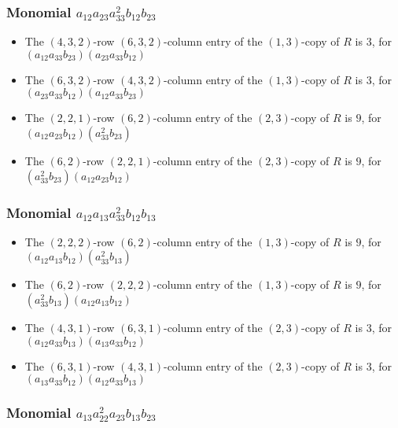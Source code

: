 \documentclass{article}
\begin{document}
\subsubsection{Monomial $ a_{12} a_{23} a_{33}^{2} b_{12} b_{23} $}

\begin{itemize}
\item The $(4, 3, 2)$-row $(6, 3, 2)$-column entry of the $ \left(1, 3\right) $-copy of $R$ is $ 3 $, for $( a_{12} a_{33} b_{23} )( a_{23} a_{33} b_{12} )$ 
\item The $(6, 3, 2)$-row $(4, 3, 2)$-column entry of the $ \left(1, 3\right) $-copy of $R$ is $ 3 $, for $( a_{23} a_{33} b_{12} )( a_{12} a_{33} b_{23} )$ 
\item The $(2, 2, 1)$-row $(6, 2)$-column entry of the $ \left(2, 3\right) $-copy of $R$ is $ 9 $, for $( a_{12} a_{23} b_{12} )( a_{33}^{2} b_{23} )$ 
\item The $(6, 2)$-row $(2, 2, 1)$-column entry of the $ \left(2, 3\right) $-copy of $R$ is $ 9 $, for $( a_{33}^{2} b_{23} )( a_{12} a_{23} b_{12} )$ 
\end{itemize}
\subsubsection{Monomial $ a_{12} a_{13} a_{33}^{2} b_{12} b_{13} $}

\begin{itemize}
\item The $(2, 2, 2)$-row $(6, 2)$-column entry of the $ \left(1, 3\right) $-copy of $R$ is $ 9 $, for $( a_{12} a_{13} b_{12} )( a_{33}^{2} b_{13} )$ 
\item The $(6, 2)$-row $(2, 2, 2)$-column entry of the $ \left(1, 3\right) $-copy of $R$ is $ 9 $, for $( a_{33}^{2} b_{13} )( a_{12} a_{13} b_{12} )$ 
\item The $(4, 3, 1)$-row $(6, 3, 1)$-column entry of the $ \left(2, 3\right) $-copy of $R$ is $ 3 $, for $( a_{12} a_{33} b_{13} )( a_{13} a_{33} b_{12} )$ 
\item The $(6, 3, 1)$-row $(4, 3, 1)$-column entry of the $ \left(2, 3\right) $-copy of $R$ is $ 3 $, for $( a_{13} a_{33} b_{12} )( a_{12} a_{33} b_{13} )$ 
\end{itemize}
\subsubsection{Monomial $ a_{13} a_{22}^{2} a_{23} b_{13} b_{23} $}
\end{document}
